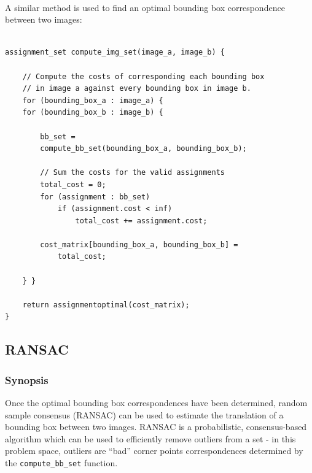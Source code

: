 \documentclass{article}
\begin{document}
~\\
A similar method is used to find an optimal bounding box correspondence between two images:
\\
\begin{minipage}{\textwidth}
\begin{lstlisting}

assignment_set compute_img_set(image_a, image_b) {

	// Compute the costs of corresponding each bounding box
	// in image a against every bounding box in image b.
	for (bounding_box_a : image_a) {
	for (bounding_box_b : image_b) {
		
		bb_set =
		compute_bb_set(bounding_box_a, bounding_box_b);
		
		// Sum the costs for the valid assignments
		total_cost = 0;
		for (assignment : bb_set) 
			if (assignment.cost < inf)
				total_cost += assignment.cost;
		
		cost_matrix[bounding_box_a, bounding_box_b] =
			total_cost;
		
	} }
	
	return assignmentoptimal(cost_matrix);
}

\end{lstlisting}
\end{minipage}
\newpage
\subsection{RANSAC}
\subsubsection{Synopsis}
Once the optimal bounding box correspondences have been determined, random sample consensus (RANSAC) can be used to estimate the translation of a bounding box between two images.  RANSAC is a probabilistic, consensus-based algorithm which can be used to efficiently remove outliers from a set - in this problem space, outliers are ``bad'' corner points correspondences determined by the \texttt{compute\_bb\_set} function.
\end{document}
